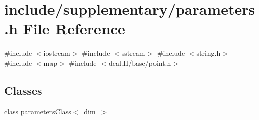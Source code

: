 \section{include/supplementary/parameters.h File Reference}
\label{parameters_8h}
{\ttfamily \#include $<$iostream$>$}\newline
{\ttfamily \#include $<$sstream$>$}\newline
{\ttfamily \#include $<$string.\+h$>$}\newline
{\ttfamily \#include $<$map$>$}\newline
{\ttfamily \#include $<$deal.\+I\+I/base/point.\+h$>$}\newline
\subsection*{Classes}
\begin{DoxyCompactItemize}
\item 
class \mbox{\hyperlink{classparameters_class}{parameters\+Class$<$ dim $>$}}
\end{DoxyCompactItemize}
